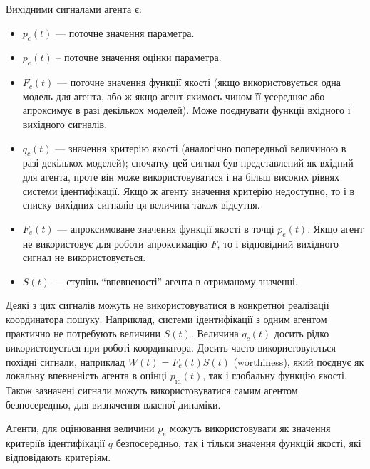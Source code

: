 Вихідними сигналами агента є:\label{atu:d:agent_out_list}

\begin{itemize}

  \item
    $p_c(t)$ ---
    поточне значення параметра.

  \item
    $p_e(t)$\label{atu:d:p_e} --
    поточне значення оцінки параметра.

  \item
    $F_c(t)$ ---
    поточне значення функції якості (якщо використовується одна
    модель для агента, або ж якщо агент якимось чином її усередняє
    або апроксимує в разі декількох моделей). Може поєднувати
    функції вхідного і вихідного сигналів.

  \item
    $q_c(t)$ ---
    значення критерію якості (аналогічно попередньої величиною в
    разі декількох моделей); спочатку цей сигнал був представлений
    як вхідний для агента, проте він може використовуватися і
    на більш високих рівнях системи ідентифікації. Якщо ж агенту
    значення критерію недоступно, то і в списку вихідних сигналів
    ця величина також відсутня.

  \item
    $F_e(t)$ ---
    апроксимоване значення функції якості в точці
    $p_e(t)$. Якщо агент не використовує для роботи апроксимацію
    $ F $, то і відповідний вихідного сигнал не використовується.

  \item
    $S(t)$ ---
    ступінь ``впевненості'' агента в отриманому значенні.

\end{itemize}

Деякі з цих сигналів можуть не використовуватися в конкретної
реалізації координатора пошуку. Наприклад, системи
ідентифікації з одним агентом практично не потребують величини
$S(t)$. Величина
$q_c(t) $ досить рідко використовується при роботі
координатора. Досить часто використовуються похідні сигнали,
наприклад
$ W(t) = F_c(t) S(t) $\label{atu:d:W} (worthiness), який поєднує як локальну впевненість
агента в оцінці
$ p_\mathrm{id} (t) $, так і глобальну функцію якості. Також зазначені
сигнали можуть використовуватися самим агентом безпосередньо,
для визначення власної динаміки.


Агенти, для оцінювання величини $p_e$ можуть використовувати як значення
критеріїв ідентифікації $q$ безпосередньо, так і тільки значення функцій
якості, які відповідають критеріям.

